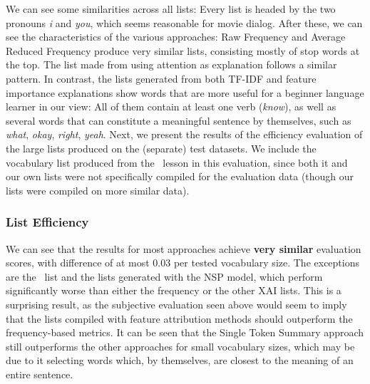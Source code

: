 We can see some similarities across all lists:
Every list is headed by the two pronouns \textit{i} and \textit{you}, which seems reasonable for movie dialog.
After these, we can see the characteristics of the various approaches:
Raw Frequency and Average Reduced Frequency produce very similar lists, consisting mostly of stop words at the top.
The list made from using attention as explanation follows a similar pattern.
In contrast, the lists generated from both TF-IDF and feature importance explanations show words that are more useful for a beginner language learner in our view:
All of them contain at least one verb (\textit{know}), as well as several words that can constitute a meaningful sentence by themselves, such as \textit{what}, \textit{okay}, \textit{right}, \textit{yeah}.
Next, we present the results of the efficiency evaluation of the large lists produced on the (separate) test datasets.
We include the vocabulary list produced from the \Rosetta\ lesson in this evaluation, since both it and our own lists were not specifically compiled for the evaluation data (though our lists were compiled on more similar data).


% 		
%
%
% 		


\subsubsection{List Efficiency}


We can see that the results for most approaches achieve \textbf{very similar} evaluation scores, with difference of at most 0.03 per tested vocabulary size.
The exceptions are the \Rosetta\ list and the lists generated with the NSP model, which perform significantly worse than either the frequency or the other XAI lists.
This is a surprising result, as the subjective evaluation seen above would seem to imply that the lists compiled with feature attribution methods should outperform the frequency-based metrics.
It can be seen that the Single Token Summary approach still outperforms the other approaches for small vocabulary sizes, which may be due to it selecting words which, by themselves, are closest to the meaning of an entire sentence.

